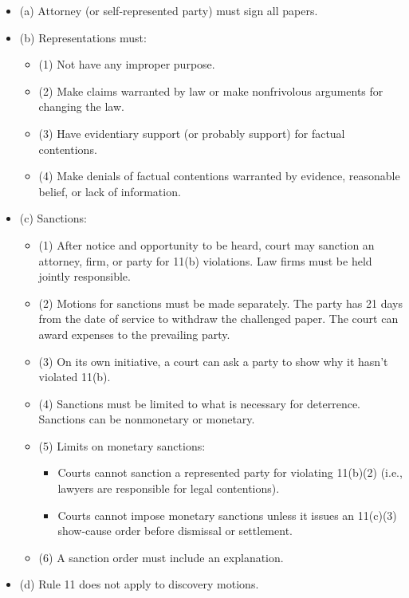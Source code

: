 \begin{itemize}
    \item (a) Attorney (or self-represented party) must sign all papers.
    \item (b) Representations must:
    \begin{itemize}
        \item (1) Not have any improper purpose.
        \item (2) Make claims warranted by law or make nonfrivolous arguments for changing the law.
        \item (3) Have evidentiary support (or probably support) for factual contentions.
        \item (4) Make denials of factual contentions warranted by evidence, reasonable belief, or lack of information.
    \end{itemize}
    \item (c) Sanctions:
    \begin{itemize}
        \item (1) After notice and opportunity to be heard, court may sanction an attorney, firm, or party for 11(b) violations. Law firms must be held jointly responsible.
        \item (2) Motions for sanctions must be made separately. The party has 21 days from the date of service to withdraw the challenged paper. The court can award expenses to the prevailing party.
        \item (3) On its own initiative, a court can ask a party to show why it hasn't violated 11(b).
        \item (4) Sanctions must be limited to what is necessary for deterrence. Sanctions can be nonmonetary or monetary.
        \item (5) Limits on monetary sanctions:
        \begin{itemize}
            \item Courts cannot sanction a represented party for violating 11(b)(2) (i.e., lawyers are responsible for legal contentions).
            \item Courts cannot impose monetary sanctions unless it issues an 11(c)(3) show-cause order before dismissal or settlement.
        \end{itemize}
        \item (6) A sanction order must include an explanation.
    \end{itemize}
    \item (d) Rule 11 does not apply to discovery motions.
\end{itemize}

